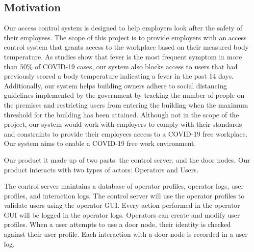 
\subsection{Motivation}

Our access control system is designed to help employers look after the safety
of their employees. The scope of this project is to provide employers with an
access control system that grants access to the workplace based on their
measured body temperature. As studies show that fever is the most frequent
symptom in more than 50\% of COVID-19 cases, our system also blocks access to
users that had previously scored a body temperature indicating a fever in the
past 14 days. Additionally, our system helps building owners adhere to social
distancing guidelines implemented by the government by tracking the number of
people on the premises and restricting users from entering the building when
the maximum threshold for the building has been attained. Although not in the
scope of the project, our system would work with employers to comply with their
standards and constraints to provide their employees access to a COVID-19 free
workplace. Our system aims to enable a COVID-19 free work environment.


Our product it made up of two parts: the control server, and the door nodes.
Our product interacts with two types of actors: Operators and Users.


The control server maintains a database of operator profiles, operator logs,
user profiles, and interaction logs.  The control server will use the operator
profiles to validate users using the operator GUI.  Every action performed in
the operator GUI will be logged in the operator logs.  Operators can create and
modify user profiles.  When a user attempts to use a door node, their identity
is checked against their user profile.  Each interaction with a door node is
recorded in a user log.
